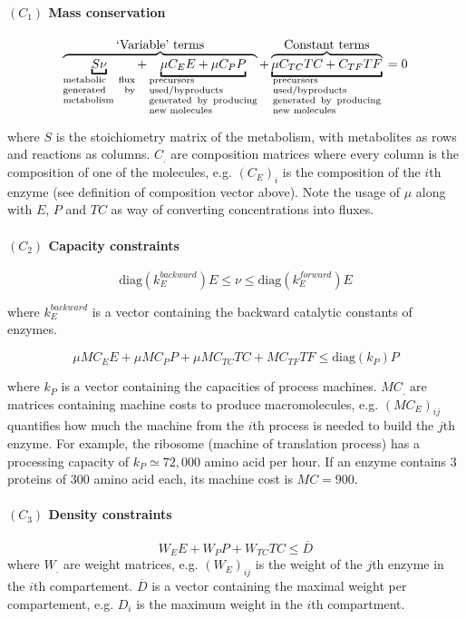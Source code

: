 \documentclass[12pt]{scrartcl}
\theoremstyle{definition}
\theoremstyle{remark}
\numberwithin{equation}{section}
\newcommand{\diag}[1]{\mathrm{diag}\left(#1\right)}
\begin{document}
\paragraph{$(C_1)$ Mass conservation}

\[
\overbrace
{
\underbracket{S\nu}_{\parbox{2cm}{\scriptsize metabolic flux generated by metabolism}}
+
\underbracket{\mu C_E E + \mu C_P P}_{\parbox{3cm}{\scriptsize precursors used/byproducts generated by producing new molecules}}
}^{\text{\normalsize `Variable' terms}}
+
\overbrace
{
\underbracket{\mu C_{TC} TC + C_{TF}TF}_{\parbox{3cm}{\scriptsize precursors used/byproducts generated by producing new molecules}}
}^{\text{\normalsize Constant terms}} \\
=0
\]

where $S$ is the stoichiometry matrix of the metabolism,
with metabolites as rows and reactions as columns.
$C_.$ are composition matrices where every column is the composition of
one of the molecules, e.g. $(C_E)_i$ is the composition of the $i$th enzyme
(see definition of composition vector above).
Note the usage of $\mu$ along with $E$, $P$ and $TC$ as way of converting
concentrations into fluxes.

\paragraph{$(C_2)$ Capacity constraints}

\[
\diag{k_E^{backward}} E \leq \nu \leq \diag{k_E^{forward}} E
\]

where $k_E^{backward}$ is a vector containing the backward catalytic constants of enzymes.

\[
\mu MC_E E + \mu MC_P P + \mu MC_{TC} TC + MC_{TF} TF \leq \diag{k_P} P
\]

where $k_P$ is a vector containing the capacities of process machines.
$MC_.$ are matrices containing machine costs to produce macromolecules,
e.g. $(MC_E)_{ij}$ quantifies how much the machine from the $i$th process is needed
to build the $j$th enzyme.
For example, the ribosome (machine of translation process) has a processing
capacity of $k_P \simeq 72,000$ amino acid per hour.
If an enzyme contains 3 proteins of $300$ amino acid each, its machine cost
is $MC = 900$.

\paragraph{$(C_3)$ Density constraints}

\[
W_E E + W_P P + W_{TC} TC \leq \overline{D}
\]
where $W_.$ are weight matrices,
e.g. $(W_E)_{ij}$ is the weight of the $j$th enzyme in the $i$th compartement.
$\overline{D}$ is a vector containing the maximal weight per compartement,
e.g. $D_i$ is the maximum weight in the $i$th compartment.



\clearpage


\clearpage

\newpage
\appendix


%

%
%
\end{document}
